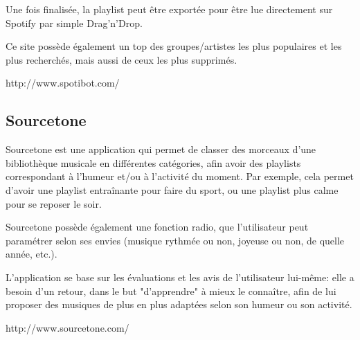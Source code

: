 Une fois finalisée, la playlist peut être exportée pour être lue directement 
sur Spotify par simple Drag'n'Drop.

Ce site possède également un top des groupes/artistes les plus populaires et 
les plus recherchés, mais aussi de ceux les plus supprimés.

http://www.spotibot.com/

\subsection{Sourcetone}

Sourcetone est une application qui permet de classer des morceaux d'une bibliothèque musicale en différentes catégories, afin avoir des playlists correspondant à l'humeur et/ou à l'activité du moment. Par exemple, cela permet d'avoir une playlist entraînante pour faire du sport, ou une playlist plus calme pour se reposer le soir.

Sourcetone possède également une fonction radio, que l'utilisateur peut paramétrer selon ses envies (musique rythmée ou non, joyeuse ou non, de quelle année, etc.).

L'application se base sur les évaluations et les avis de l'utilisateur lui-même: elle a besoin d'un retour, dans le but "d'apprendre" à mieux le connaître, afin de lui proposer des musiques de plus en plus adaptées selon son humeur ou son activité.

http://www.sourcetone.com/